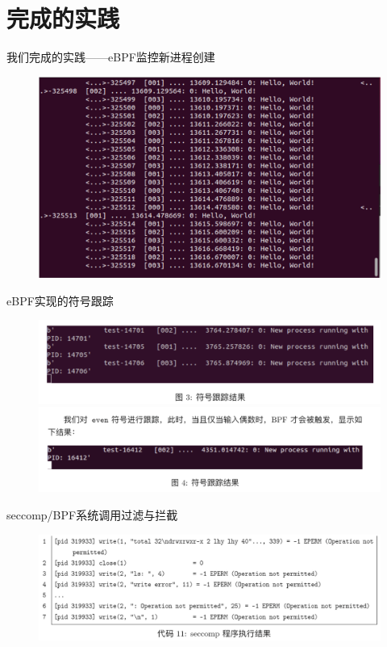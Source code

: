 \documentclass[UTF8,aspectratio=169,fontset=macnew,xcolor=table]{ctexbeamer}
\begin{document}
\section{完成的实践}

\begin{frame}{我们完成的实践——eBPF监控新进程创建}
    \begin{figure}[H]
        \centering
        \includegraphics[width=0.68\columnwidth]{pic5.png}
    \end{figure}
\end{frame}

\begin{frame}{eBPF实现的符号跟踪}
    \begin{figure}[H]
        \centering
        \includegraphics[width=0.72\columnwidth]{pic6.png}
        \includegraphics[width=0.72\columnwidth]{pic7.png}
    \end{figure}
\end{frame}

\begin{frame}{seccomp/BPF系统调用过滤与拦截}
    \begin{figure}[H]
        \centering
        \includegraphics[width=0.8\columnwidth]{pic8.png}
    \end{figure}
\end{frame}
\end{document}
